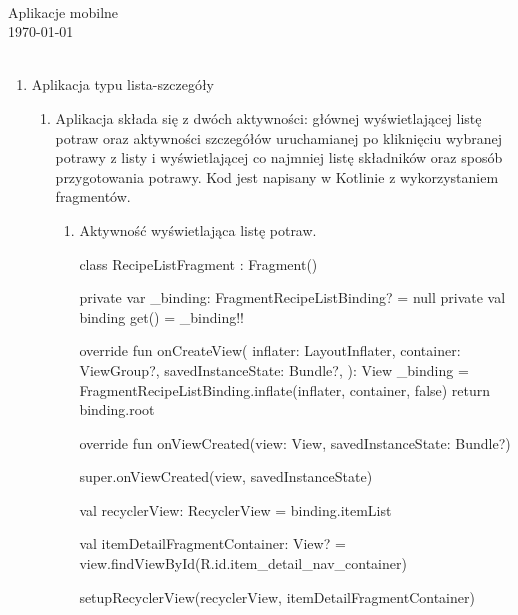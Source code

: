 \documentclass{article}
\begin{document}
\begin{center}\vspace{-1cm}
    \textbf{ \Huge }\\
    \LARGE Aplikacje mobilne\\
    \large \today \\~\\
\end{center}

\begin{enumerate}
\item Aplikacja typu lista-szczegóły
\begin{enumerate}
\item Aplikacja składa się z dwóch aktywności: głównej wyświetlającej listę potraw oraz aktywności szczegółów uruchamianej po kliknięciu wybranej potrawy z listy i wyświetlającej co najmniej listę składników oraz sposób przygotowania potrawy.
Kod jest napisany w Kotlinie z wykorzystaniem fragmentów.

\begin{enumerate}

\item Aktywność wyświetlająca listę potraw.
\begin{mylisting}
class RecipeListFragment : Fragment() {
    private var _binding: FragmentRecipeListBinding? = null
    private val binding get() = _binding!!

    override fun onCreateView(
        inflater: LayoutInflater, container: ViewGroup?,
        savedInstanceState: Bundle?,
    ): View {
        _binding = FragmentRecipeListBinding.inflate(inflater, container, false)
        return binding.root
    }

    override fun onViewCreated(view: View, savedInstanceState: Bundle?) {
        super.onViewCreated(view, savedInstanceState)

        val recyclerView: RecyclerView = binding.itemList

        val itemDetailFragmentContainer: View? = 
        view.findViewById(R.id.item_detail_nav_container)

        setupRecyclerView(recyclerView, itemDetailFragmentContainer)
    }
}
\end{mylisting}


\end{enumerate}
\end{enumerate}
\end{enumerate}
\end{document}
